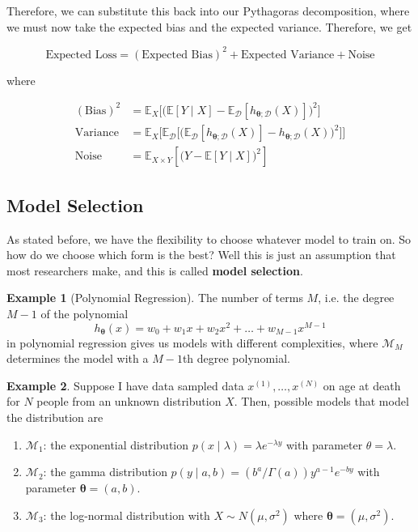 \documentclass{article}
\theoremstyle{definition}
\newtheorem{example}{Example}[section]
\begin{document}
      Therefore, we can substitute this back into our Pythagoras decomposition, where we must now take the expected bias and the expected variance. Therefore, we get 

        \[\text{Expected Loss} = (\text{Expected Bias})^2 + \text{Expected Variance} + \text{Noise}\]

      where 

      \begin{align*}
        (\text{Bias})^2 & = \mathbb{E}_X \big[ \big( \mathbb{E}[Y \mid X] - \mathbb{E}_\mathcal{D} [h_{{\boldsymbol{\theta}}; \mathcal{D}} (X)] \big)^2 \big] \\
        \text{Variance} & = \mathbb{E}_X \big[ \mathbb{E}_\mathcal{D} \big[ \big( \mathbb{E}_\mathcal{D} [h_{{\boldsymbol{\theta}}; \mathcal{D}} (X)] - h_{\boldsymbol{\theta}; \mathcal{D}}(X) \big)^2 \big] \big] \\
        \text{Noise} & = \mathbb{E}_{X \times Y}[\big(Y - \mathbb{E}[Y \mid X]\big)^2]
      \end{align*}

  \subsection{Model Selection}

    As stated before, we have the flexibility to choose whatever model to train on. So how do we choose which form is the best? Well this is just an assumption that most researchers make, and this is called \textbf{model selection}. 

    \begin{example}[Polynomial Regression]
      The number of terms $M$, i.e. the degree $M-1$ of the polynomial 
        \[h_{\boldsymbol{\theta}} (x) = w_0 + w_1 x + w_2 x^2 + \ldots + w_{M-1} x^{M-1}\]
      in polynomial regression gives us models with different complexities, where $\mathcal{M}_M$ determines the model with a $M-1$th degree polynomial. 
    \end{example}

    \begin{example}
      Suppose I have data sampled data $x^{(1)}, \ldots, x^{(N)}$ on age at death for $N$ people from an unknown distribution $X$. Then, possible models that model the distribution are 

      \begin{enumerate}
        \item $\mathcal{M}_1$: the exponential distribution $p(x \mid \lambda) = \lambda e^{-\lambda y}$ with parameter $\theta = \lambda$. 
        \item $\mathcal{M}_2$: the gamma distribution $p(y \mid a, b) = (b^a / \Gamma(a)) y^{a - 1} e^{- by}$ with parameter $\boldsymbol{\theta} = (a, b)$. 
        \item $\mathcal{M}_3$: the log-normal distribution with $X \sim N (\mu, \sigma^2)$ where ${\boldsymbol{\theta}} = (\mu, \sigma^2)$. 
      \end{enumerate}
    \end{example}
\end{document}
